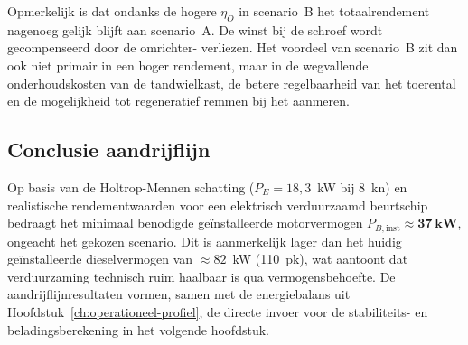Opmerkelijk is dat ondanks de hogere $\eta_O$ in scenario~B het totaalrendement nagenoeg
gelijk blijft aan scenario~A. De winst bij de schroef wordt gecompenseerd door de omrichter-
verliezen. Het voordeel van scenario~B zit dan ook niet primair in een hoger rendement, maar
in de wegvallende onderhoudskosten van de tandwielkast, de betere regelbaarheid van het
toerental en de mogelijkheid tot regeneratief remmen bij het aanmeren.
 
\subsection{Conclusie aandrijflijn}
\label{subsec:aandrijflijn-conclusie}
 
Op basis van de Holtrop-Mennen schatting ($P_E = 18{,}3$~kW bij 8~kn) en realistische
rendementwaarden voor een elektrisch verduurzaamd beurtschip bedraagt het minimaal benodigde
geïnstalleerde motorvermogen $P_{B,\mathrm{inst}} \approx \mathbf{37\ kW}$, ongeacht het
gekozen scenario. Dit is aanmerkelijk lager dan het huidig geïnstalleerde dieselvermogen van
$\approx 82$~kW (110~pk), wat aantoont dat verduurzaming technisch ruim haalbaar is qua
vermogensbehoefte. De aandrijflijnresultaten vormen, samen met de energiebalans uit
Hoofdstuk~\ref{ch:operationeel-profiel}, de directe invoer voor de stabiliteits- en
beladingsberekening in het volgende hoofdstuk.
 